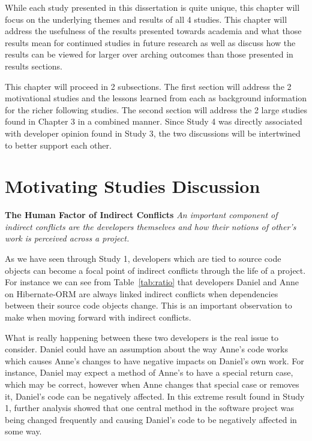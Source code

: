 \label{chapter:discussion}

While each study presented in this dissertation is quite unique, this chapter will focus on the underlying themes and
results of all 4 studies. This chapter will address the usefulness of the results presented towards academia and
what those results mean for continued studies in future research as well as discuss how the results can be viewed
for larger over arching outcomes than those presented in results sections. 

This chapter will proceed in 2 subsections. The first section will address the 2 motivational studies and the lessons
learned from each as background information for the richer following studies. The second section will address the 2 large
studies found in Chapter 3 in a combined manner. Since Study 4 was directly associated with developer opinion found in Study
3, the two discussions will be intertwined to better support each other.

\section{Motivating Studies Discussion}

\textbf{The Human Factor of Indirect Conflicts} \textit{An important component of indirect conflicts are the developers
themselves and how their notions of other's work is perceived across a project.}

As we have seen through Study 1, developers which are tied to source code objects can become a focal point of
indirect conflicts through the life of a project. For instance we can see from Table~\ref{tab:ratio} that
developers Daniel and Anne on Hibernate-ORM are always linked indirect conflicts when dependencies between
their source code objects change. This is an important observation to make when moving forward with indirect
conflicts.

What is really happening between these two developers is the real issue to consider. Daniel could have an
assumption about the way Anne's code works which causes Anne's changes to have negative impacts on Daniel's
own work. For instance, Daniel may expect a method of Anne's to have a special return case, which may be correct,
however when Anne changes that special case or removes it, Daniel's code can be negatively affected. In this extreme
result found in Study 1, further analysis showed that one central method in the software project was being changed
frequently and causing Daniel's code to be negatively affected in some way.

